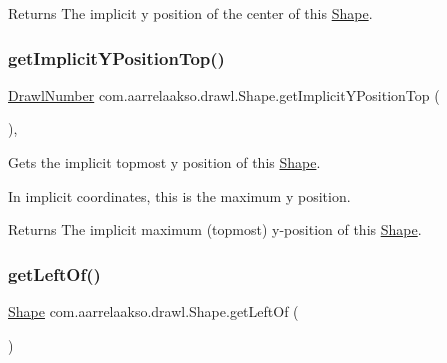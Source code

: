 \begin{DoxyReturn}{Returns}
The implicit y position of the center of this \hyperlink{classcom_1_1aarrelaakso_1_1drawl_1_1_shape}{Shape}. 
\end{DoxyReturn}
\mbox{\label{classcom_1_1aarrelaakso_1_1drawl_1_1_shape_afb64d51ac2023ad770bbc8f37061d5b0}} 
\subsubsection{\texorpdfstring{get\+Implicit\+Y\+Position\+Top()}{getImplicitYPositionTop()}}
{\footnotesize\ttfamily \hyperlink{classcom_1_1aarrelaakso_1_1drawl_1_1_drawl_number}{Drawl\+Number} com.\+aarrelaakso.\+drawl.\+Shape.\+get\+Implicit\+Y\+Position\+Top (\begin{DoxyParamCaption}{ }\end{DoxyParamCaption})\hspace{0.3cm}{\ttfamily [protected]}, {\ttfamily [inherited]}}



Gets the implicit topmost y position of this \hyperlink{classcom_1_1aarrelaakso_1_1drawl_1_1_shape}{Shape}. 

In implicit coordinates, this is the maximum y position.

\begin{DoxyReturn}{Returns}
The implicit maximum (topmost) y-\/position of this \hyperlink{classcom_1_1aarrelaakso_1_1drawl_1_1_shape}{Shape}. 
\end{DoxyReturn}
\mbox{\label{classcom_1_1aarrelaakso_1_1drawl_1_1_shape_a2b19d5964ac46d545a7bae3133df6532}} 
\subsubsection{\texorpdfstring{get\+Left\+Of()}{getLeftOf()}}
{\footnotesize\ttfamily \hyperlink{classcom_1_1aarrelaakso_1_1drawl_1_1_shape}{Shape} com.\+aarrelaakso.\+drawl.\+Shape.\+get\+Left\+Of (\begin{DoxyParamCaption}{ }\end{DoxyParamCaption})\hspace{0.3cm}{\ttfamily [inherited]}}




